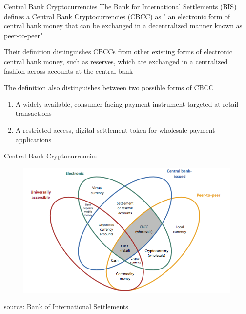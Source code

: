 \documentclass[11pt]{beamer}
\begin{document}
\begin{frame}{Central Bank Cryptocurrencies}
	The Bank for International Settlements (BIS) defines a Central Bank Cryptocurrencies (CBCC) as " an electronic form of central bank money that can be
	exchanged in a decentralized manner known as peer-to-peer" \\ \vspace{3mm}

	Their definition distinguishes CBCCs from other existing forms of electronic central bank money, such as reserves, which are exchanged in a centralized fashion across accounts at the central bank\\ \vspace{3mm}

	The definition also distinguishes between two possible forms of CBCC
	\begin{enumerate}
		\item A widely available, consumer-facing payment instrument targeted at retail transactions
		\item A restricted-access, digital settlement token for wholesale payment applications
	\end{enumerate}
\end{frame}



\begin{frame}{Central Bank Cryptocurrencies}
	\begin{figure}[]
		\centering
		\includegraphics  [width=4.in]{Images/taxonomy}
	\end{figure}
	\begin{scriptsize}
		source: \href{https://www.bis.org/publ/qtrpdf/r_qt1709f.pdf}{Bank of International Settlements}
	\end{scriptsize}
\end{frame}

\end{document}
